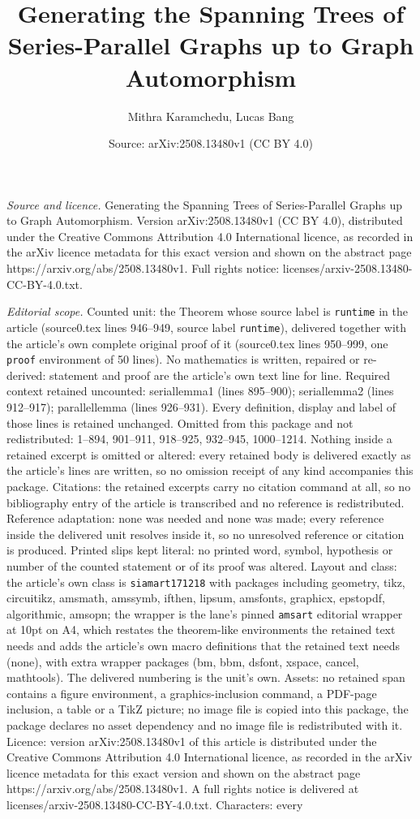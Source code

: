 \documentclass[10pt,a4paper]{amsart}
\title[Generating the Spanning Trees of Series-Parallel Graphs up t]{Generating the Spanning Trees of Series-Parallel Graphs up to Graph Automorphism}
\author{Mithra Karamchedu, Lucas Bang}
\date{Source: arXiv:2508.13480v1 (CC BY 4.0)}
\begin{document}
\maketitle

\noindent\emph{Source and licence.} Generating the Spanning Trees of Series-Parallel Graphs up to Graph Automorphism. Version arXiv:2508.13480v1 (CC BY 4.0), distributed under the Creative Commons Attribution 4.0 International licence, as recorded in the arXiv licence metadata for this exact version and shown on the abstract page https://arxiv.org/abs/2508.13480v1. Full rights notice: licenses/arxiv-2508.13480-CC-BY-4.0.txt.\par\smallskip

\noindent\textit{Editorial scope.} Counted unit: the Theorem whose source label is \texttt{runtime} in the article (source0.tex lines 946--949, source label \texttt{runtime}), delivered together with the article's own complete original proof of it (source0.tex lines 950--999, one \texttt{proof} environment of 50 lines). No mathematics is written, repaired or re-derived: statement and proof are the article's own text line for line. Required context retained uncounted: seriallemma1 (lines 895--900); seriallemma2 (lines 912--917); parallellemma (lines 926--931). Every definition, display and label of those lines is retained unchanged. Omitted from this package and not redistributed: 1--894, 901--911, 918--925, 932--945, 1000--1214. Nothing inside a retained excerpt is omitted or altered: every retained body is delivered exactly as the article's lines are written, so no omission receipt of any kind accompanies this package. Citations: the retained excerpts carry no citation command at all, so no bibliography entry of the article is transcribed and no reference is redistributed. Reference adaptation: none was needed and none was made; every reference inside the delivered unit resolves inside it, so no unresolved reference or citation is produced. Printed slips kept literal: no printed word, symbol, hypothesis or number of the counted statement or of its proof was altered. Layout and class: the article's own class is \texttt{siamart171218} with packages including geometry, tikz, circuitikz, amsmath, amssymb, ifthen, lipsum, amsfonts, graphicx, epstopdf, algorithmic, amsopn; the wrapper is the lane's pinned \texttt{amsart} editorial wrapper at 10pt on A4, which restates the theorem-like environments the retained text needs and adds the article's own macro definitions that the retained text needs (none), with extra wrapper packages (bm, bbm, dsfont, xspace, cancel, mathtools). The delivered numbering is the unit's own. Assets: no retained span contains a figure environment, a graphics-inclusion command, a PDF-page inclusion, a table or a TikZ picture; no image file is copied into this package, the package declares no asset dependency and no image file is redistributed with it. Licence: version arXiv:2508.13480v1 of this article is distributed under the Creative Commons Attribution 4.0 International licence, as recorded in the arXiv licence metadata for this exact version and shown on the abstract page https://arxiv.org/abs/2508.13480v1. A full rights notice is delivered at licenses/arxiv-2508.13480-CC-BY-4.0.txt. Characters: every 
\end{document}
